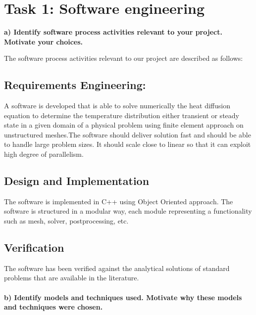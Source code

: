 \documentclass[a4paper, 11pt, oneside]{scrartcl}
\begin{document}




\section*{Task 1: Software engineering}
\textbf{a) Identify software process activities relevant to your project. Motivate your choices.}

The software process activities relevant to our project are described as follows:

\subsection*{Requirements Engineering:}
A software is developed that is able to solve numerically the heat diffusion equation to determine the temperature distribution either transient or steady state in a given domain of a physical problem using finite element approach on unstructured meshes.The software should deliver solution fast and should be able to handle large problem sizes. It should scale close to linear so that it can exploit high degree of parallelism.
\subsection*{Design and Implementation}
The software is implemented in C++ using Object Oriented approach. The software is structured in a modular way, each module representing a functionality such as mesh, solver, postprocessing, etc.
\subsection*{Verification}
The software has been verified against the analytical solutions of standard problems that are available in the literature.
\\
\\
\textbf{b) Identify models and techniques used. Motivate why these models and techniques were chosen.}
\end{document}
